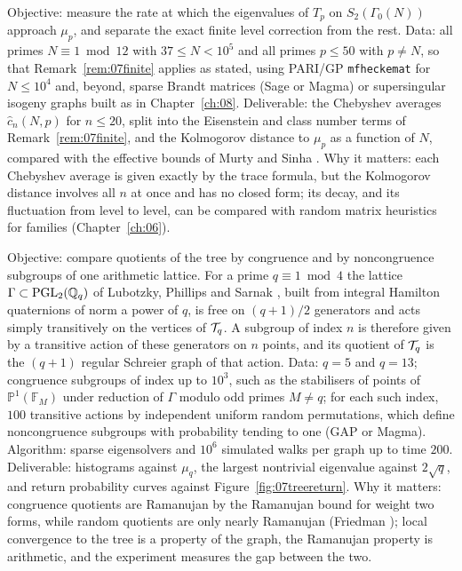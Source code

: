 \begin{compproblem}
Objective: measure the rate at which the eigenvalues of $T_p$ on $S_2(\Gamma_0(N))$ approach $\mu_p$, and separate the exact finite level correction from the rest. Data: all primes $N\equiv1\bmod12$ with $37\le N<10^5$ and all primes $p\le50$ with $p\ne N$, so that Remark~\ref{rem:07finite} applies as stated, using PARI/GP \texttt{mfheckemat} for $N\le10^4$ and, beyond, sparse Brandt matrices (Sage or Magma) or supersingular isogeny graphs built as in Chapter~\ref{ch:08}. Deliverable: the Chebyshev averages $\hat c_n(N,p)$ for $n\le20$, split into the Eisenstein and class number terms of Remark~\ref{rem:07finite}, and the Kolmogorov distance to $\mu_p$ as a function of $N$, compared with the effective bounds of Murty and Sinha \cite{murtysinha2009}. Why it matters: each Chebyshev average is given exactly by the trace formula, but the Kolmogorov distance involves all $n$ at once and has no closed form; its decay, and its fluctuation from level to level, can be compared with random matrix heuristics for families (Chapter~\ref{ch:06}).
\end{compproblem}

\begin{compproblem}
Objective: compare quotients of the tree by congruence and by noncongruence subgroups of one arithmetic lattice. For a prime $q\equiv1\bmod4$ the lattice $\Gamma\subset\mathrm{PGL}_2(\mathbb{Q}_q)$ of Lubotzky, Phillips and Sarnak \cite{lps1988}, built from integral Hamilton quaternions of norm a power of $q$, is free on $(q+1)/2$ generators and acts simply transitively on the vertices of $\mathcal{T}_q$. A subgroup of index $n$ is therefore given by a transitive action of these generators on $n$ points, and its quotient of $\mathcal{T}_q$ is the $(q+1)$ regular Schreier graph of that action. Data: $q=5$ and $q=13$; congruence subgroups of index up to $10^3$, such as the stabilisers of points of $\mathbb P^1(\mathbb F_M)$ under reduction of $\Gamma$ modulo odd primes $M\ne q$; for each such index, $100$ transitive actions by independent uniform random permutations, which define noncongruence subgroups with probability tending to one (GAP or Magma). Algorithm: sparse eigensolvers and $10^6$ simulated walks per graph up to time $200$. Deliverable: histograms against $\mu_q$, the largest nontrivial eigenvalue against $2\sqrt q$, and return probability curves against Figure~\ref{fig:07treereturn}. Why it matters: congruence quotients are Ramanujan by the Ramanujan bound for weight two forms, while random quotients are only nearly Ramanujan (Friedman \cite{friedman2008}); local convergence to the tree is a property of the graph, the Ramanujan property is arithmetic, and the experiment measures the gap between the two.
\end{compproblem}

